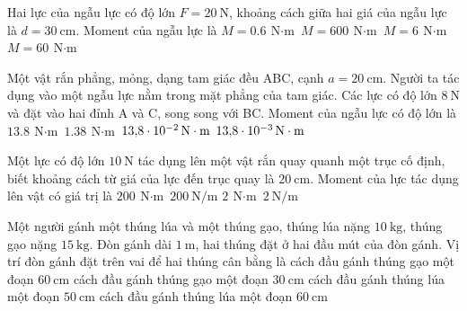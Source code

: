 \begin{ex}
	Hai lực của ngẫu lực có độ lớn $F=\SI{20}{\newton}$, khoảng cách giữa hai giá của ngẫu lực là $d=\SI{30}{\centi\meter}$. Moment của ngẫu lực là
	\choice
	{$M=\SI{0.6}{\newton\cdot\meter}$}
	{$M=\SI{600}{\newton\cdot\meter}$}
	{\True $M=\SI{6}{\newton\cdot\meter}$}
	{$M=\SI{60}{\newton\cdot\meter}$}
\end{ex}
\begin{ex}
	Một vật rắn phẳng, mỏng, dạng tam giác đều ABC, cạnh $a=\SI{20}{\centi\meter}$. Người ta tác dụng vào một ngẫu lực nằm trong mặt phẳng của tam giác. Các lực có độ lớn $\SI{8}{\newton}$ và đặt vào hai đỉnh A và C, song song với BC. Moment của ngẫu lực có độ lớn là
	\choice
	{$\SI{13.8}{\newton\cdot\meter}$}
	{\True $\SI{1.38}{\newton\cdot\meter}$}
	{$\SI{13.8E-2}{\newton\cdot\meter}$}
	{$\SI{13.8E-3}{\newton\cdot\meter}$}
\end{ex}
\begin{ex}
	Một lực có độ lớn $\SI{10}{\newton}$ tác dụng lên một vật rắn quay quanh một trục cố định, biết khoảng cách từ giá của lực đến trục quay là $\SI{20}{\centi\meter}$. Moment của lực tác dụng lên vật có giá trị là
	\choice
	{$\SI{200}{\newton\cdot\meter}$}
	{$\SI{200}{\newton/\meter}$}
	{\True $\SI{2}{\newton\cdot\meter}$}
	{$\SI{2}{\newton/\meter}$}
\end{ex}
\begin{ex}
Một người gánh một thúng lúa và một thúng gạo, thúng lúa nặng $\SI{10}{\kilogram}$, thúng gạo nặng $\SI{15}{\kilogram}$. Đòn gánh dài $\SI{1}{\meter}$, hai thúng đặt ở hai đầu mút của đòn gánh. Vị trí đòn gánh đặt trên vai để hai thúng cân bằng là	
	\choice
	{cách đầu gánh thúng gạo một đoạn $\SI{60}{\centi\meter}$}
	{cách đầu gánh thúng gạo một đoạn $\SI{30}{\centi\meter}$}
	{cách đầu gánh thúng lúa một đoạn $\SI{50}{\centi\meter}$}
	{\True cách đầu gánh thúng lúa một đoạn $\SI{60}{\centi\meter}$}
\end{ex}
